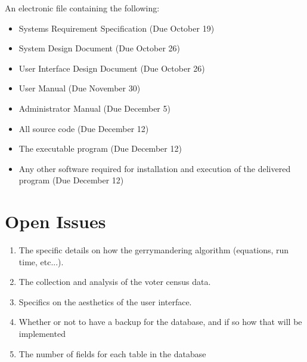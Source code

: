 \documentclass{article}
\begin{document}
\vspace{5mm}

An electronic file containing the following: 

\vspace{2.5mm}

\begin{adjustwidth}{2em}{0pt}
\begin{itemize}

\item Systems Requirement Specification (Due October 19)
\item System Design Document (Due October 26)
\item User Interface Design Document (Due October 26)
\item User Manual (Due November 30)
\item Administrator Manual (Due December 5)
\item All source code (Due December 12)
\item The executable program (Due December 12)
\item Any other software required for installation and execution of the delivered program (Due December 12)

\end{itemize}
\end{adjustwidth}


\section{Open Issues}\label{sec:openIssues}

\vspace{2.5mm}

\begin{addmargin}[2em]{0em}

\begin{enumerate}

\item The specific details on how the gerrymandering algorithm (equations, run time, etc...).
\item The collection and analysis of the voter census data.
\item Specifics on the aesthetics of the user interface.
\item Whether or not to have a backup for the database, and if so how that will be implemented
\item The number of fields for each table in the database

\end{enumerate}
\end{addmargin}
\end{document}
